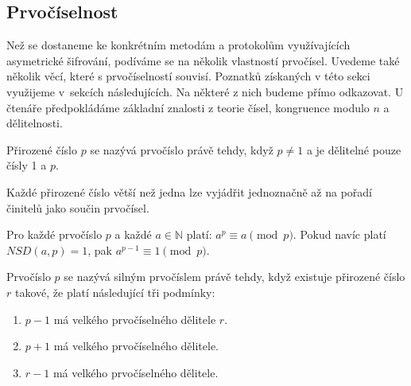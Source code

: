 \documentclass[
  program=infoi,
  biblatex=false,
  figures=true,
  glossaries,
  tables=false,
  sourcecodes=true,
  index
]{kidiplom}
\begin{document}
        

\subsection{Prvočíselnost}\label{sub:primality}

    Než se dostaneme ke konkrétním metodám a protokolům využívajících asymetrické šifrování, podíváme se na několik vlastností prvočísel.
    Uvedeme také několik věcí, které s prvočíselností souvisí.
    Poznatků získaných v této sekci využijeme v~sekcích následujících.
    Na některé z nich budeme přímo odkazovat.
    U čtenáře předpokládáme základní znalosti z teorie čísel, kongruence modulo $n$ a dělitelnosti.

    \begin{definition}\label{def:primes}
        Přirozené číslo $p$ se nazývá prvočíslo právě tehdy, když $p \neq 1$ a je dělitelné pouze čísly 1 a $p$.
    \end{definition}

    \begin{theorem}\label{the:fta}
        Každé přirozené číslo větší než jedna lze vyjádřit jednoznačně
        až na pořadí činitelů jako součin prvočísel.
    \end{theorem}

    \begin{theorem}\label{the:little-fermat}
        Pro každé prvočíslo $p$ a každé $a \in \mathbb{N}$ platí: $a^p \equiv a \pmod{p}$.
        Pokud navíc platí $NSD(a,p) = 1$, pak $a^{p-1} \equiv 1 \pmod{p}$.
    \end{theorem}

    \begin{definition}\label{def:strong-primality}
        Prvočíslo $p$ se nazývá silným prvočíslem právě tehdy, když existuje přirozené číslo $r$ takové,
        že platí následující tři podmínky:

        \begin{enumerate}[label=(\alph*)]
            \item 
                $p-1$ má velkého prvočíselného dělitele $r$.
            \item 
                $p+1$ má velkého prvočíselného dělitele.
            \item 
                $r-1$ má velkého prvočíselného dělitele.
            \end{enumerate}
    \end{definition}
\end{document}
